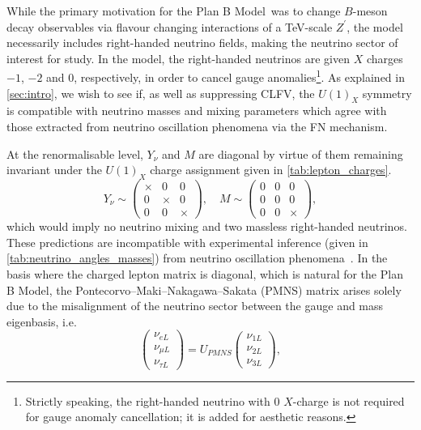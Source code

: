 \documentclass[11pt,letterpaper]{article}
\newcommand{\model}{Plan B Model}
\begin{document}
While the primary motivation for the \model\  was to
change $B$-meson decay
observables via flavour changing interactions of a TeV-scale $Z^\prime$, the
model necessarily includes right-handed neutrino fields, making 
the neutrino sector of interest for study. 
In the model, the right-handed neutrinos are given
$X$ charges  $-1$, $-2$ and $0$, respectively, in order to cancel gauge
anomalies\footnote{Strictly speaking, the right-handed neutrino with $0$
$X$-charge is not required for gauge anomaly cancellation; it is added for
aesthetic reasons.}. As explained in \cref{sec:intro}, we wish to see if,  as
well as suppressing CLFV, the
$U(1)_X$ symmetry is compatible with neutrino masses and mixing parameters
which agree with those extracted from neutrino oscillation phenomena via the
FN mechanism. 

At the renormalisable level, ${Y}_\nu$ and ${M}$  are diagonal by virtue of them remaining invariant under the $U(1)_X$ charge assignment given in \cref{tab:lepton_charges}.
\begin{equation} \label{renormalizable Y and M}
    Y_{\nu}  \sim  
    \begin{pmatrix}
    \times & 0 & 0 \\
    0 & \times & 0 \\
    0 & 0 & \times 
    \end{pmatrix}, \,\,\,\,\,\,
    M  \sim 
    \begin{pmatrix}
    0 & 0 & 0 \\
    0 & 0 & 0 \\
    0 & 0 & \times 
    \end{pmatrix},
\end{equation}
which would imply no neutrino mixing and two massless right-handed neutrinos. These predictions are incompatible with experimental inference (given in \cref{tab:neutrino_angles_masses}) from neutrino oscillation phenomena~\cite{PDG}. In the basis where the charged lepton matrix is diagonal, which is natural for the \model, the Pontecorvo–Maki–Nakagawa–Sakata (PMNS) matrix arises solely due to the misalignment of the neutrino sector between the gauge and mass eigenbasis, i.e.
\begin{equation} \label{eqn:PMNSdefn1}
    \begin{pmatrix}
        \nu_{eL} \\ \nu_{\mu L} \\ \nu_{\tau L} 
    \end{pmatrix} = U_{PMNS} \begin{pmatrix}
        \nu_{1L} \\ \nu_{2 L} \\ \nu_{3 L} 
    \end{pmatrix},
\end{equation}
\end{document}
